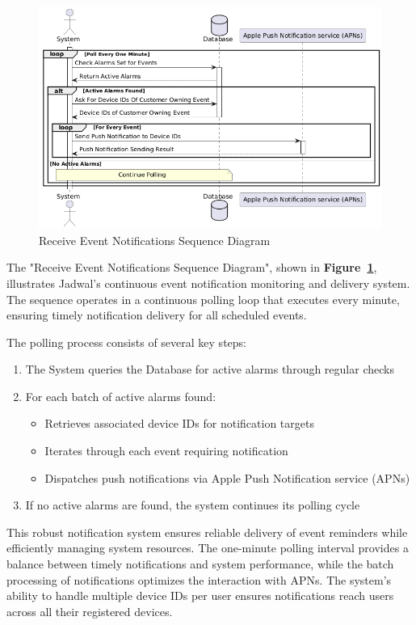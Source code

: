 \begin{figure}[!h]
  \centering
  \includegraphics[width=\textwidth]{images/docs/diagrams/sequence-diagrams/all-sequence-diagrams/Receive Event Notifications.png}
  \caption{Receive Event Notifications Sequence Diagram}
  \label{fig:seq/receive-event-notifications}
\end{figure}

The "Receive Event Notifications Sequence Diagram", shown in \textbf{Figure~\ref{fig:seq/receive-event-notifications}}, illustrates Jadwal's continuous event notification monitoring and delivery system. The sequence operates in a continuous polling loop that executes every minute, ensuring timely notification delivery for all scheduled events.

The polling process consists of several key steps:
\begin{enumerate}
  \item The System queries the Database for active alarms through regular checks
  \item For each batch of active alarms found:
        \begin{itemize}
          \item Retrieves associated device IDs for notification targets
          \item Iterates through each event requiring notification
          \item Dispatches push notifications via Apple Push Notification service (APNs)
        \end{itemize}
  \item If no active alarms are found, the system continues its polling cycle
\end{enumerate}

This robust notification system ensures reliable delivery of event reminders while efficiently managing system resources. The one-minute polling interval provides a balance between timely notifications and system performance, while the batch processing of notifications optimizes the interaction with APNs. The system's ability to handle multiple device IDs per user ensures notifications reach users across all their registered devices.